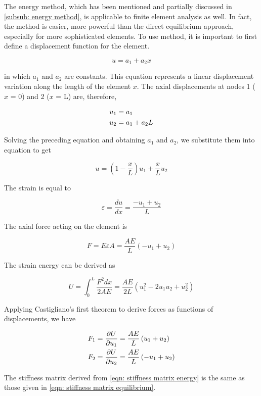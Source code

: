 \documentclass[
10pt,
a4paper,
openany,
svgnames,
]{book}
\begin{document}
The energy method,  which has been mentioned and partially discussed in \cref{subsub: energy method}, is applicable to finite element analysis as well. In fact, the method is easier, more powerful than the direct equilibrium approach, especially for more sophisticated elements. To use method, it is important to first define a displacement function for the element.

\[u = a_1 + a_2x\]

in which $a_1$ and $a_2$ are constants. This equation represents a linear displacement variation along the length of the element $x$. The axial displacements at nodes 1 ($x$ = 0) and 2 ($x$ = L) are, therefore,

\[\begin{gathered}
  u_1 = a_1 \hfill \\
  u_2 = a_1 + a_2L \hfill \\ 
\end{gathered} \]

Solving the preceding equation and obtaining $a_1$ and $a_2$, we substitute them into equation to get

\[u = \left( 1 - \frac{x}{L} \right)u_1 + \frac{x}{L}u_2\]

The strain is equal to

\[\varepsilon  = \frac{du}{dx} = \frac{-u_1 + u_2}{L}\]

The axial force acting on the element is

\[F = E\varepsilon A = \frac{{AE}}{L}( - {u_1} + {u_2})\]

The strain energy can be derived as

\[U = \int_0^L \frac{F^2dx}{2AE} = \frac{AE}{2L}\left( u_1^2 - 2u_1u_2 + u_2^2 \right)\]

Applying Castigliano’s first theorem to derive forces as functions of displacements, we have

\begin{equation} \label{eqn: stiffness matrix energy}
  \begin{gathered}
    F_1 = \frac{\partial U}{\partial u_1} = \frac{AE}{L}\left( u_1 + u_2 \right) \hfill \\
    F_2 = \frac{\partial U}{\partial u_2} = \frac{AE}{L}\left( -u_1 + u_2 \right) \hfill \\ 
  \end{gathered}
\end{equation}

The stiffness matrix derived from \cref{eqn: stiffness matrix energy} is the same as those given in \cref{eqn: stiffness matrix equilibrium}.
\end{document}
